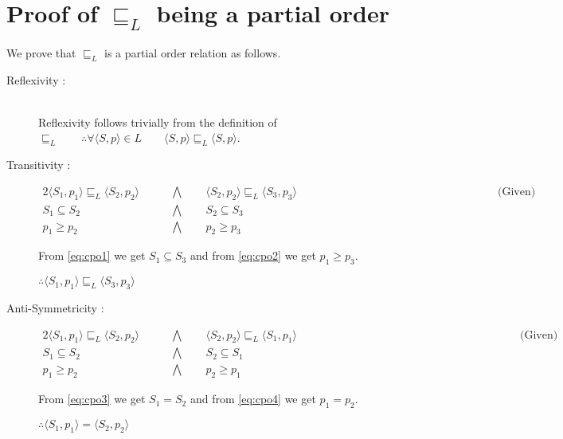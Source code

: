 \documentclass[final,3p, review, times]{util/elsarticle}
\begin{document}
\appendix

\section{\\Proof of $\sqsubseteq_L$ being a partial order}
\label{app:concrete_partial}

We prove that $\sqsubseteq_L$ is a partial order relation as follows.

\begin{description}
\item[Reflexivity :] \hfill \\
	Reflexivity follows trivially from the definition of $\sqsubseteq_L\qquad\therefore\forall \langle S,p\rangle\in L\qquad\langle S,p\rangle\sqsubseteq_L\langle S,p\rangle$.
\item[Transitivity :] \hfill
\begin{alignat}{2}
    \langle S_1,p_1\rangle\sqsubseteq_L\langle S_2,p_2\rangle &\qquad\bigwedge\qquad \langle S_2,p_2\rangle\sqsubseteq_L\langle S_3,p_3\rangle\qquad\qquad\qquad\qquad\qquad\qquad\qquad\qquad\qquad\text{(Given)}\nonumber\\
    S_1\subseteq S_2 &\qquad\bigwedge\qquad S_2\subseteq S_3\label{eq:cpo1}\\
    p_1\geq p_2 &\qquad\bigwedge\qquad p_2\geq p_3\label{eq:cpo2}
\end{alignat}

From \ref{eq:cpo1} we get $S_1\subseteq S_3$ and from \ref{eq:cpo2} we get
$p_1\geq p_3$.
	
	$\therefore \langle S_1,p_1\rangle\sqsubseteq_L\langle S_3,p_3\rangle$
\item[Anti-Symmetricity :] \hfill
\begin{alignat}{2}
    \langle S_1,p_1\rangle\sqsubseteq_L\langle S_2,p_2\rangle &\qquad\bigwedge\qquad \langle S_2,p_2\rangle\sqsubseteq_L\langle S_1,p_1\rangle\qquad\qquad\qquad\qquad\qquad\qquad\qquad\qquad\qquad\qquad\text{(Given)}\nonumber\\
    S_1\subseteq S_2 &\qquad\bigwedge\qquad S_2\subseteq S_1\label{eq:cpo3}\\
    p_1\geq p_2 &\qquad\bigwedge\qquad p_2\geq p_1\label{eq:cpo4}
\end{alignat}

From \ref{eq:cpo3} we get $S_1=S_2$ and from \ref{eq:cpo4} we get $p_1=p_2$.
	
	$\therefore \langle S_1,p_1\rangle=\langle S_2,p_2\rangle$
\end{description}
\end{document}
